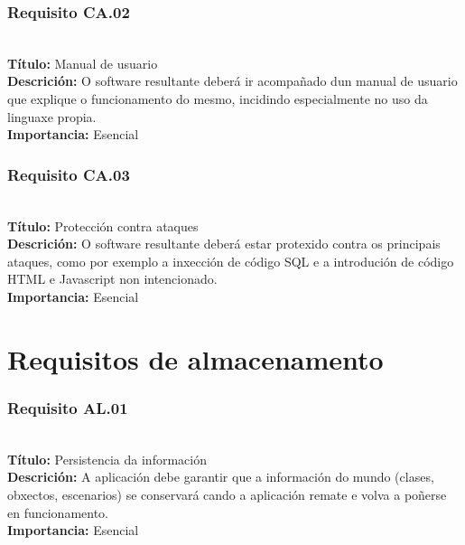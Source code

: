 \subsubsection{Requisito CA.02}~\\
{\bf Título:} Manual de usuario\\
{\bf Descrición:} O software resultante deberá ir acompañado dun manual de
usuario que explique o funcionamento do mesmo, incidindo especialmente no uso
da linguaxe propia.\\
{\bf Importancia:} Esencial

\subsubsection{Requisito CA.03}~\\
{\bf Título:} Protección contra ataques\\
{\bf Descrición:} O software resultante deberá estar protexido contra os
principais ataques, como por exemplo a inxección de código SQL e a introdución
de código HTML e Javascript non intencionado.\\
{\bf Importancia:} Esencial

\section{Requisitos de almacenamento}
\subsubsection{Requisito AL.01}~\\
{\bf Título:} Persistencia da información\\
{\bf Descrición:} A aplicación debe garantir que a información do mundo
(clases, obxectos, escenarios) se conservará cando a aplicación remate e volva a
poñerse en funcionamento.\\
{\bf Importancia:} Esencial
